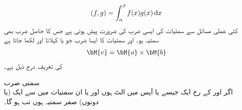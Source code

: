 \begin{align}
(f,g)=\int_{\alpha}^{\beta} f(x)g(x)\dif x
\end{align}
کئی عملی مسائل سے سمتیات کی ایسی ضرب کی ضرورت پیش ہوتی ہے جس کا حاصل ضرب  بھی سمتیہ ہو۔ اور  سمتیات کا ایسا ضرب جو  یا  کہلاتا اور  لکھا جاتا ہے
\begin{align*}
\bM{v}=\bM{a}\times \bM{b}
\end{align*}
کی تعریف درج ذیل ہے۔

\quad سمتی ضرب\\
اگر  اور  کے رخ ایک جیسے یا آپس میں الٹ ہوں اور یا ان سمتیات میں سے ایک (یا دونوں) صفر سمتیہ ہوں تب  ہو گا۔

